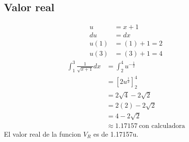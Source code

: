 \documentclass[11pt,letterpaper]{article}
\begin{document}
\subsection*{Valor real}
\begin{equation*}
  \begin{split}
    u &= x+1\\
    du &= dx\\
    u(1) &= (1)+1 = 2\\
    u(3) &= (3)+1 = 4 
  \end{split}
\end{equation*}
\begin{equation*}
  \begin{split}
    \int_1^3 \frac{1}{\sqrt{x+1}}dx &= \int_2^4 u^{-\frac{1}{2}}\\
    &=\left[ 2u^{\frac{1}{2}} \right]_2^4\\
    &=2\sqrt{4}-2\sqrt{2}\\
    &=2(2)-2\sqrt{2}\\
    &=4-2\sqrt{2}\\
    &\approx 1.17157 \ \text{con calculadora}
  \end{split}
  \end{equation*}
El valor real de la funcion $V_R$ es de 1.17157u.
  
\end{document}

